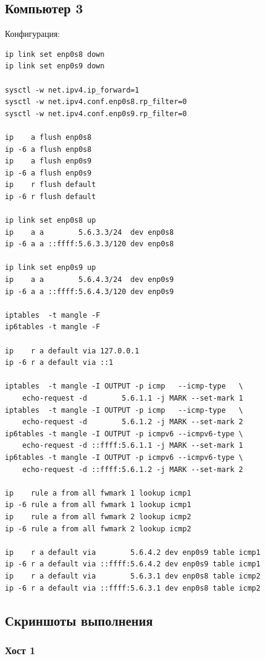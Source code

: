 \subsection{Компьютер 3}
Конфигурация:
\begin{verbatim}
ip link set enp0s8 down
ip link set enp0s9 down

sysctl -w net.ipv4.ip_forward=1
sysctl -w net.ipv4.conf.enp0s8.rp_filter=0
sysctl -w net.ipv4.conf.enp0s9.rp_filter=0

ip    a flush enp0s8
ip -6 a flush enp0s8
ip    a flush enp0s9
ip -6 a flush enp0s9
ip    r flush default
ip -6 r flush default

ip link set enp0s8 up
ip    a a        5.6.3.3/24  dev enp0s8
ip -6 a a ::ffff:5.6.3.3/120 dev enp0s8

ip link set enp0s9 up
ip    a a        5.6.4.3/24  dev enp0s9
ip -6 a a ::ffff:5.6.4.3/120 dev enp0s9

iptables  -t mangle -F
ip6tables -t mangle -F

ip    r a default via 127.0.0.1
ip -6 r a default via ::1

iptables  -t mangle -I OUTPUT -p icmp   --icmp-type   \
    echo-request -d        5.6.1.1 -j MARK --set-mark 1
iptables  -t mangle -I OUTPUT -p icmp   --icmp-type   \
    echo-request -d        5.6.1.2 -j MARK --set-mark 2
ip6tables -t mangle -I OUTPUT -p icmpv6 --icmpv6-type \
    echo-request -d ::ffff:5.6.1.1 -j MARK --set-mark 1
ip6tables -t mangle -I OUTPUT -p icmpv6 --icmpv6-type \
    echo-request -d ::ffff:5.6.1.2 -j MARK --set-mark 2

ip    rule a from all fwmark 1 lookup icmp1
ip -6 rule a from all fwmark 1 lookup icmp1
ip    rule a from all fwmark 2 lookup icmp2
ip -6 rule a from all fwmark 2 lookup icmp2

ip    r a default via        5.6.4.2 dev enp0s9 table icmp1
ip -6 r a default via ::ffff:5.6.4.2 dev enp0s9 table icmp1
ip    r a default via        5.6.3.1 dev enp0s8 table icmp2
ip -6 r a default via ::ffff:5.6.3.1 dev enp0s8 table icmp2
\end{verbatim}

\subsection{Скриншоты выполнения}
\subsubsection{Хост 1}
